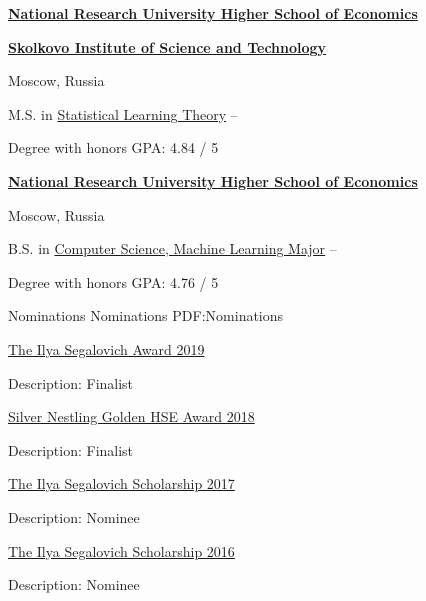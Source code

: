 \documentclass[letterpaper,MMMyyyy,nonstopmode]{simpleresumecv}
\begin{document}
\begin{Body}
\Entry
\href{https://www.hse.ru/en/}
{\textbf{National Research University Higher School of Economics}}
\par
\href{https://www.skoltech.ru/en/}{\textbf{Skolkovo Institute of Science and Technology}}
\par
Moscow, Russia

\Gap
\BulletItem
M.S. in
\href{https://www.hse.ru/en/ma/sltheory/}
{Statistical Learning Theory}
\hfill
{} --
\begin{Detail}
\SubBulletItem
Degree with honors
\SubBulletItem
GPA: 4.84 / 5
\end{Detail}
\Gap

\Entry
\href{https://www.hse.ru/en/}
{\textbf{National Research University Higher School of Economics}}
\par
Moscow, Russia

\Gap
\BulletItem
B.S. in
\href{https://www.hse.ru/en/ba/ami/}
{Computer Science, Machine Learning Major}
\hfill
{} --
\begin{Detail}
\SubBulletItem
Degree with honors
\SubBulletItem
GPA: 4.76 / 5
\end{Detail}



\Section
{Nominations}
{Nominations}
{PDF:Nominations}

\BulletItem
\href{https://cs.hse.ru/en/stipend/}{The Ilya Segalovich Award 2019}
\begin{Detail}
\Item
Description: Finalist
\end{Detail}

\BulletItem
\href{https://www.hse.ru/gold/cm/silver/2018/gadetsky}{Silver Nestling Golden HSE Award 2018}
\begin{Detail}
\Item
Description: Finalist
\end{Detail}

\BulletItem
\href{https://yandex.com/scholarships/students}{The Ilya Segalovich Scholarship 2017}
\begin{Detail}
\Item
Description: Nominee
\end{Detail}

\BulletItem
\href{https://yandex.com/scholarships/students}{The Ilya Segalovich Scholarship 2016}
\begin{Detail}
\Item
Description: Nominee
\end{Detail}



\end{Body}
\end{document}
